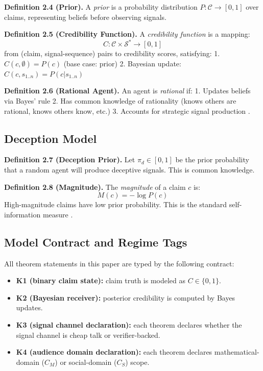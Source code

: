 \textbf{Definition 2.4 (Prior).} A \emph{prior} is a probability
distribution \(P : \mathcal{C} \to [0,1]\) over claims, representing
beliefs before observing signals.

\textbf{Definition 2.5 (Credibility Function).} A \emph{credibility
function} is a mapping:
\[C : \mathcal{C} \times \mathcal{S}^* \to [0,1]\] from (claim,
signal-sequence) pairs to credibility scores, satisfying: 1.
\(C(c, \emptyset) = P(c)\) (base case: prior) 2. Bayesian update:
\(C(c, s_{1..n}) = P(c | s_{1..n})\)

\textbf{Definition 2.6 (Rational Agent).} An agent is \emph{rational}
if: 1. Updates beliefs via Bayes' rule 2. Has common knowledge of
rationality \cite{aumann1995backward} (knows others are rational, knows others know, etc.) 3.
Accounts for strategic signal production \cite{cho1987signaling}.

\subsection{Deception Model}\label{deception-model}

\textbf{Definition 2.7 (Deception Prior).} Let \(\pi_d \in [0,1]\) be
the prior probability that a random agent will produce deceptive
signals. This is common knowledge.

\textbf{Definition 2.8 (Magnitude).} The \emph{magnitude} of a claim
\(c\) is: \[M(c) = -\log P(c)\] High-magnitude claims have low prior
probability. This is the standard self-information measure \cite{shannon1948}.

\subsection{Model Contract and Regime Tags}\label{sec:credibility-contract}

All theorem statements in this paper are typed by the following contract:
\begin{itemize}
\item \textbf{K1 (binary claim state):} claim truth is modeled as \(C \in \{0,1\}\).
\item \textbf{K2 (Bayesian receiver):} posterior credibility is computed by Bayes updates.
\item \textbf{K3 (signal channel declaration):} each theorem declares whether the signal channel is cheap talk or verifier-backed.
\item \textbf{K4 (audience domain declaration):} each theorem declares mathematical-domain (\(C_M\)) or social-domain (\(C_S\)) scope.
\end{itemize}


